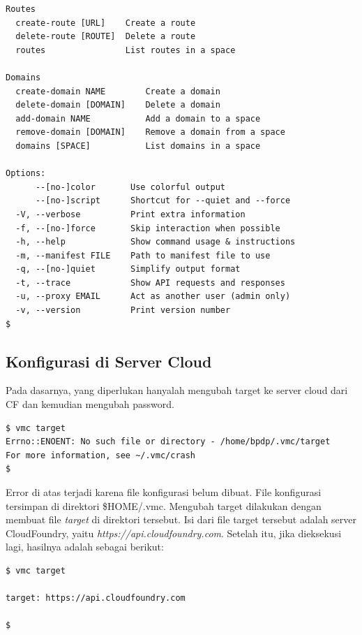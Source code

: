 \begin{lstlisting}
Routes
  create-route [URL]  	Create a route
  delete-route [ROUTE]	Delete a route
  routes              	List routes in a space

Domains
  create-domain NAME    	Create a domain
  delete-domain [DOMAIN]	Delete a domain
  add-domain NAME       	Add a domain to a space
  remove-domain [DOMAIN]	Remove a domain from a space
  domains [SPACE]       	List domains in a space

Options:
      --[no-]color       Use colorful output
      --[no-]script      Shortcut for --quiet and --force
  -V, --verbose          Print extra information
  -f, --[no-]force       Skip interaction when possible
  -h, --help             Show command usage & instructions
  -m, --manifest FILE    Path to manifest file to use
  -q, --[no-]quiet       Simplify output format
  -t, --trace            Show API requests and responses
  -u, --proxy EMAIL      Act as another user (admin only)
  -v, --version          Print version number
$ 
\end{lstlisting}

\subsection{Konfigurasi di Server Cloud}

Pada dasarnya, yang diperlukan hanyalah mengubah target ke server cloud dari CF dan kemudian mengubah password.

\lstset{language=bash,caption=Mengubah target server - belum ada konfigurasi}
\begin{lstlisting}
$ vmc target 
Errno::ENOENT: No such file or directory - /home/bpdp/.vmc/target
For more information, see ~/.vmc/crash
$
\end{lstlisting}

Error di atas terjadi karena file konfigurasi belum dibuat. File konfigurasi tersimpan di direktori \$HOME/.vmc. Mengubah target dilakukan dengan membuat file \textit{target} di direktori tersebut. Isi dari file target tersebut adalah server CloudFoundry, yaitu \textit{https://api.cloudfoundry.com}. Setelah itu, jika dieksekusi lagi, hasilnya adalah sebagai berikut:

\lstset{language=bash,caption=Mengubah target server - setelah konfigurasi}
\begin{lstlisting}
$ vmc target 
 
target: https://api.cloudfoundry.com

$ 
\end{lstlisting}

